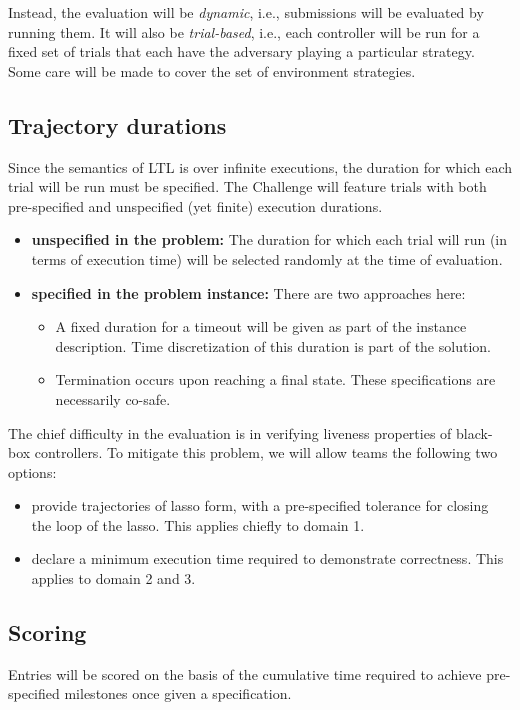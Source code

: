 \documentclass{amsart}
\theoremstyle{definition}
\begin{document}
Instead, the evaluation will be \emph{dynamic}, i.e., submissions will be evaluated by running them. It will also be 
\emph{trial-based}, i.e., each controller will be run for a fixed set of trials that each have the adversary playing a 
particular strategy. Some care will be made to cover the set of environment strategies.


\subsection{Trajectory durations}
Since the semantics of LTL is over infinite executions, the duration for which each trial will be run must be specified. 
The Challenge will feature trials with both pre-specified and unspecified (yet finite) execution durations. 

\begin{itemize}
\item \textbf{unspecified in the problem:}
The duration for which each trial will run (in terms of execution time) will be selected randomly at the time of evaluation.

\item \textbf{specified in the problem instance:}
There are two approaches here:
\begin{itemize}
\item A fixed duration for a timeout will be given as part of the instance description. Time discretization of this duration is part of the solution.
\item Termination occurs upon reaching a final state. These specifications are necessarily co-safe.
\end{itemize}

\end{itemize}

The chief difficulty in the evaluation is in verifying liveness properties of black-box controllers. To mitigate this problem,
we will allow teams the following two options:
\begin{itemize}
\item provide trajectories of lasso form, with a pre-specified tolerance for closing the loop of the lasso. This applies chiefly to domain 1.
\item declare a minimum execution time required to demonstrate correctness. This applies to domain 2 and 3.
\end{itemize}

\subsection{Scoring}
Entries will be scored on the basis of the cumulative time required to achieve pre-specified milestones once given a specification.
\end{document}
